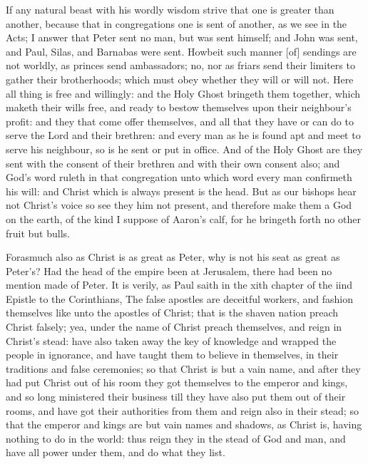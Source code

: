 If any natural beast with his wordly wisdom strive that 
one is greater than another, because that in congregations 
one is sent of another, as we see in the Acts; I answer 
that Peter sent no man, but was sent himself; and John 
was sent, and Paul, Silas, and Barnabas were sent.
Howbeit such manner [of] sendings are not worldly, as 
princes send ambassadors; no, nor as friars send their limiters
to gather their brotherhoods; which must obey 
whether they will or will not. Here all thing is free and willingly:
and the Holy Ghost bringeth them together, which 
maketh their wills free, and ready to bestow themselves upon
their neighbour's profit: and they that come offer themselves,
and all that they have or can do to serve the Lord 
and their brethren: and every man as he is found apt and 
meet to serve his neighbour, so is he sent or put in office. 
And of the Holy Ghost are they sent with the consent of 
their brethren and with their own consent also; and God's 
word ruleth in that congregation unto which word every 
man confirmeth his will: and Christ which is always present 
is the head. But as our bishops hear not Christ's voice 
so see they him not present, and therefore make them a 
God on the earth, of the kind I suppose of Aaron's calf, 
for he bringeth forth no other fruit but bulls. 

Forasmuch also as Christ is as great as Peter, why is 
not his seat as great as Peter's? Had the head of the empire
been at Jerusalem, there had been no mention made of 
Peter. It is verily, as Paul saith in the xith chapter of the 
iind Epistle to the Corinthians, The false apostles are deceitful
workers, and fashion themselves like unto the 
apostles of Christ; that is the shaven nation preach Christ 
falsely; yea, under the name of Christ preach themselves,
and reign in Christ's stead: have also taken away 
the key of knowledge and wrapped the people in ignorance, 
and have taught them to believe in themselves, in their traditions
and false ceremonies; so that Christ is but a vain
name, and after they had put Christ out of his room they
got themselves to the emperor and kings, and so long ministered
their business till they have also put them out of 
their rooms, and have got their authorities from them and
reign also in their stead; so that the emperor and kings are 
but vain names and shadows, as Christ is, having nothing to 
do in the world: thus reign they in the stead of God and 
man, and have all power under them, and do what they 
list.

